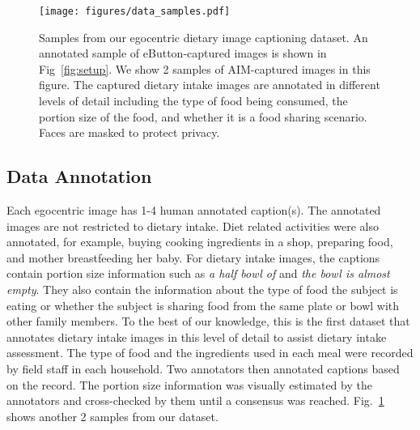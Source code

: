 \documentclass[journal]{IEEEtran}
\begin{document}
\begin{figure}[!t]
\centerline{\texttt{[image: figures/data\_samples.pdf]}}
\caption{Samples from our egocentric dietary image captioning dataset. An annotated sample of eButton-captured images is shown in Fig~\ref{fig:setup}. We show 2 samples of AIM-captured images in this figure. The captured dietary intake images are annotated in different levels of detail including the type of food being consumed, the portion size of the food, and whether it is a food sharing scenario. Faces are masked to protect privacy.}
\label{fig:data_samples}
\end{figure}



\subsection{Data Annotation}

Each egocentric image has 1-4 human annotated caption(s). The annotated images are not restricted to dietary intake. Diet related activities were also annotated, for example, buying cooking ingredients in a shop, preparing food, and mother breastfeeding her baby. For dietary intake images, the captions contain portion size information such as \textit{a half bowl of} and \textit{the bowl is almost empty}. They also contain the information about the type of food the subject is eating or whether the subject is sharing food from the same plate or bowl with other family members. To the best of our knowledge, this is the first dataset that annotates dietary intake images in this level of detail to assist dietary intake assessment. The type of food and the ingredients used in each meal were recorded by field staff in each household. Two annotators then annotated captions based on the record. The portion size information was visually estimated by the annotators and cross-checked by them until a consensus was reached. Fig.~\ref{fig:data_samples} shows another 2 samples from our dataset.
\end{document}
